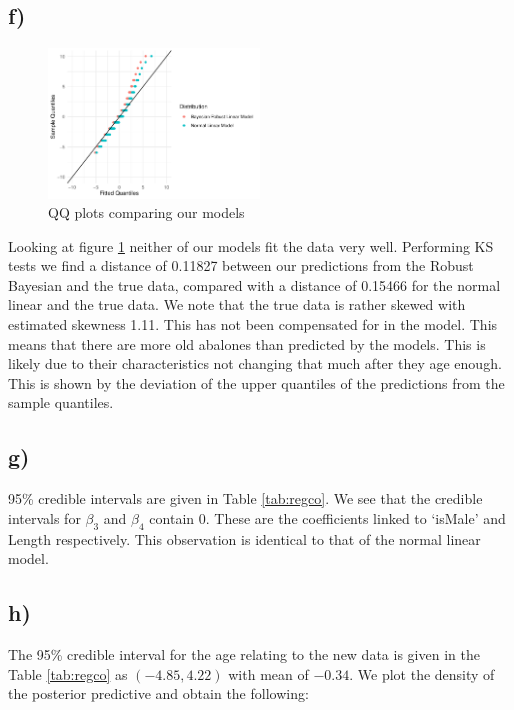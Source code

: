 \documentclass[10pt]{extarticle}
\begin{document}
\subsection*{f)}

\begin{figure}[H]
	\centering
	\includegraphics[width = 0.5\textwidth]{../qqplotmodcomp}
	\caption{QQ plots comparing our models}
	\label{fig:qqp}
\end{figure}
Looking at figure \ref{fig:qqp} neither of our models fit the data very well. Performing KS tests we find a distance of 0.11827 between our predictions from the Robust Bayesian and the true data, compared with a distance of 0.15466 for the normal linear and the true data. We note that the true data is rather skewed with estimated skewness 1.11. This has not been compensated for in the model. This means that there are more old abalones than predicted by the models. This is likely due to their characteristics not changing that much after they age enough. This is shown by the deviation of the upper quantiles of the predictions from the sample quantiles.

\subsection*{g)}

95\% credible intervals are given in Table \ref{tab:regco}. We see that the credible intervals for $\beta_3$ and  $\beta_4$ contain 0. These are the coefficients linked to `isMale' and Length respectively. This observation is identical to that of the normal linear model. 

\subsection*{h)}

The 95\% credible interval for the age relating to the  new data is given in the Table \ref{tab:regco} as $(-4.85, 4.22)$ with mean of $-0.34$. We plot the density of the posterior predictive and obtain the following:
\end{document}
